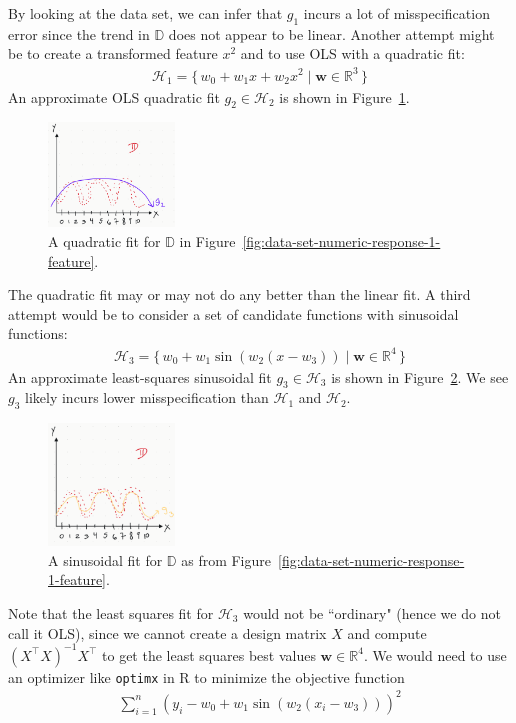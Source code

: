 \documentclass[12pt, a4paper]{article}
\theoremstyle{definition}
\begin{document}
	By looking at the data set, we can infer that $g_1$ incurs a lot of misspecification
	error since the trend in $\mathbb{D}$ does not appear to be linear.
	Another attempt might be to create a transformed feature $x^2$ and to
	use OLS with a quadratic fit:
	\begin{align*}
		\mathcal{H}_1 = \{\,
		w_0 + w_1 x + w_2 x^2 \mid \bm{w}\in \mathbb{R}^3
		\,\}
	\end{align*}
	An approximate OLS quadratic fit $g_2\in \mathcal{H}_2$ is shown in
	Figure~\ref{fig:data-set-numeric-response-1-feature-quadratic}.
	\begin{figure}
		\centering
		\includegraphics[width=0.3\textwidth]{data-set-numeric-response-1-feature-ols-quadratic}
		\caption{A quadratic fit for $\mathbb{D}$ in Figure~\ref{fig:data-set-numeric-response-1-feature}.}
		\label{fig:data-set-numeric-response-1-feature-quadratic}
	\end{figure}
	The quadratic fit may or may not do any better than the linear fit.
	A third attempt would be to consider a set of candidate functions with sinusoidal
	functions:
	\begin{align*}
		\mathcal{H}_3 = \{\,
		w_0 + w_1 \sin(w_2(x - w_3)) \mid \bm{w}\in \mathbb{R}^4
		\,\}
	\end{align*}
	An approximate least-squares sinusoidal fit $g_3\in \mathcal{H}_3$ is shown in
	Figure~\ref{fig:data-set-numeric-response-1-feature-sine}. We see $g_3$
	likely incurs lower misspecification than $\mathcal{H}_1$ and $\mathcal{H}_2$.
	\begin{figure}
		\centering
		\includegraphics[width=0.3\textwidth]{data-set-numeric-response-1-feature-ols-sine}
		\caption{A sinusoidal fit for $\mathbb{D}$ as from Figure~\ref{fig:data-set-numeric-response-1-feature}.}
		\label{fig:data-set-numeric-response-1-feature-sine}
	\end{figure}
	Note that the least squares fit for $\mathcal{H}_3$ would not be ``ordinary"
	(hence we do not call it OLS), since we cannot create a design matrix $X$
	and compute $(X^\top X)^{-1}X^\top$ to get the least squares best values
	$\bm{w}\in \mathbb{R}^4$. We would need to use an optimizer like \texttt{optimx}
	in R to minimize the objective function
	\begin{align*}
		\sum_{i=1}^{n}(y_i - w_0 + w_1\sin(w_2(x_i-w_3)))^2
	\end{align*}
	
\end{document}
